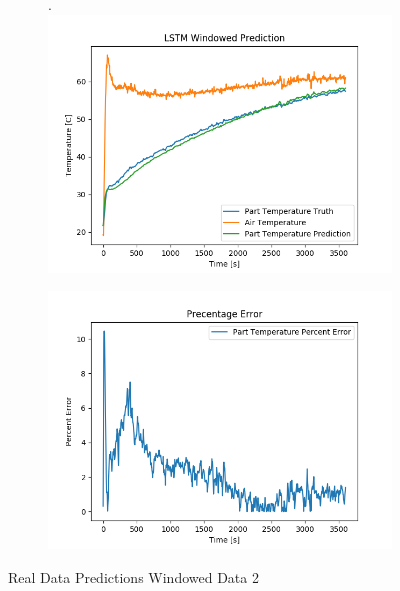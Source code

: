 \begin{figure}[ht]
    \begin{subfigure}{.5\linewidth}.
        \centering
    	\includegraphics[width=\linewidth]{lstm/lstm_w_predict_april2.png}
    \end{subfigure}
    \begin{subfigure}{.5\linewidth}
    	\centering
    	\includegraphics[width=\linewidth]{lstm/lstm_w_predict_april2_error.png}
    \end{subfigure}
    \caption{Real Data Predictions Windowed Data 2}
    \label{fig:real_data_window_lstm2}
\end{figure}
\newpage


